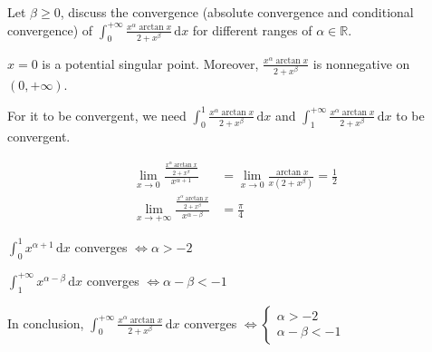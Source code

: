 \begin{example}
    Let $\beta\geq0$, discuss the convergence (absolute convergence and conditional convergence) of $\int_0^{+\infty}\frac{x^{\alpha}\arctan x}{2+x^{\beta}}\,\mathrm{d}x$ for different ranges of $\alpha\in\mathbb{R}$.

    $x=0$ is a potential singular point. Moreover, $\frac{x^{\alpha}\arctan x}{2+x^{\beta}}$ is nonnegative on $(0,+\infty)$.

    For it to be convergent, we need $\int_0^1\frac{x^{\alpha}\arctan x}{2+x^{\beta}}\,\mathrm{d}x$ and $\int_1^{+\infty}\frac{x^{\alpha}\arctan x}{2+x^{\beta}}\,\mathrm{d}x$ to be convergent.

    \begin{align*}
        \lim_{x\to0}\frac{\frac{x^{\alpha}\arctan x}{2+x^{\beta}}}{x^{\alpha+1}}           & =\lim_{x\to0}\frac{\arctan x}{x(2+x^{\beta})}=\frac{1}{2} \\
        \lim_{x\to+\infty}\frac{\frac{x^{\alpha}\arctan x}{2+x^{\beta}}}{x^{\alpha-\beta}} & =\frac{\pi}{4}
    \end{align*}

    $\int_0^1x^{\alpha+1}\,\mathrm{d}x$ converges $\iff\alpha>-2$

    $\int_1^{+\infty}x^{\alpha-\beta}\,\mathrm{d}x$ converges $\iff\alpha-\beta<-1$

    In conclusion, $\int_0^{+\infty}\frac{x^{\alpha}\arctan x}{2+x^{\beta}}\,\mathrm{d}x$ converges $\iff\begin{cases}
            \alpha>-2 \\
            \alpha-\beta<-1
        \end{cases}$
\end{example}